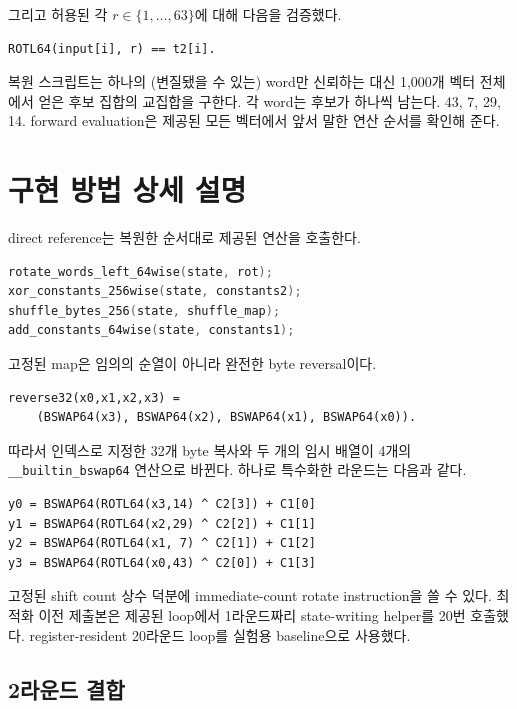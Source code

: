 \documentclass[11pt,a4paper]{article}
\begin{document}
그리고 허용된 각 $r\in\{1,\ldots,63\}$에 대해 다음을 검증했다.

\begin{lstlisting}
ROTL64(input[i], r) == t2[i].
\end{lstlisting}

복원 스크립트는 하나의 (변질됐을 수 있는) word만 신뢰하는 대신 1,000개
벡터 전체에서 얻은 후보 집합의 교집합을 구한다.  각 word는 후보가 하나씩
남는다. 43, 7, 29, 14.  forward evaluation은 제공된 모든 벡터에서 앞서
말한 연산 순서를 확인해 준다.

\section{구현 방법 상세 설명}

direct reference는 복원한 순서대로 제공된 연산을 호출한다.

\begin{lstlisting}[language=C]
rotate_words_left_64wise(state, rot);
xor_constants_256wise(state, constants2);
shuffle_bytes_256(state, shuffle_map);
add_constants_64wise(state, constants1);
\end{lstlisting}

고정된 map은 임의의 순열이 아니라 완전한 byte reversal이다.

\begin{lstlisting}
reverse32(x0,x1,x2,x3) =
    (BSWAP64(x3), BSWAP64(x2), BSWAP64(x1), BSWAP64(x0)).
\end{lstlisting}

따라서 인덱스로 지정한 32개 byte 복사와 두 개의 임시 배열이 4개의
\texttt{\_\_builtin\_bswap64} 연산으로 바뀐다.  하나로 특수화한 라운드는
다음과 같다.

\begin{lstlisting}
y0 = BSWAP64(ROTL64(x3,14) ^ C2[3]) + C1[0]
y1 = BSWAP64(ROTL64(x2,29) ^ C2[2]) + C1[1]
y2 = BSWAP64(ROTL64(x1, 7) ^ C2[1]) + C1[2]
y3 = BSWAP64(ROTL64(x0,43) ^ C2[0]) + C1[3]
\end{lstlisting}

고정된 shift count 상수 덕분에 immediate-count rotate instruction을 쓸
수 있다.  최적화 이전 제출본은 제공된 loop에서 1라운드짜리
state-writing helper를 20번 호출했다.  register-resident 20라운드
loop를 실험용 baseline으로 사용했다.

\subsection{2라운드 결합}
\end{document}
